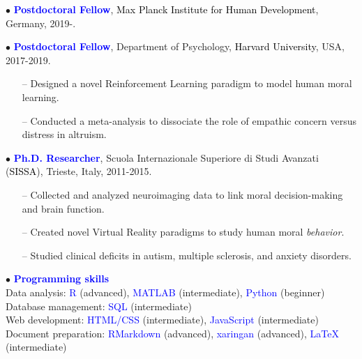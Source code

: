 \documentclass[10pt]{article}
\begin{document}
	\header


	$\bullet$ \textbf{\textcolor{blue}{Postdoctoral Fellow}}, \textcolor{black}{Max Planck Institute for Human Development}, Germany, 2019-.
	\miniskip
	
	$\bullet$ \textbf{\textcolor{blue}{Postdoctoral Fellow}}, Department of Psychology, \textcolor{black}{Harvard University}, USA, 2017-2019.
	\vspace*{-0.09in}
	
	\begin{itemize}
	\itemsep-0.1em 
	\item[--] Designed a novel Reinforcement Learning paradigm to model human moral learning.	
	\item[--] Conducted a meta-analysis to dissociate the role of empathic concern versus distress in altruism.
	\end{itemize}
	\miniskip
	\vspace*{-0.09in}

	$\bullet$ \textbf{\textcolor{blue}{Ph.D. Researcher}}, Scuola Internazionale Superiore di Studi Avanzati (\textcolor{black}{SISSA}), Trieste, Italy, 2011-2015.
	\vspace*{-0.09in}

	\begin{itemize}
	\itemsep-0.1em 
	\item[--] Collected	and analyzed neuroimaging data to link moral decision-making and brain function.
	\item[--] Created novel Virtual Reality paradigms to study human moral \textit{behavior}.
	\item[--] Studied clinical deficits in autism, multiple sclerosis, and anxiety disorders.
	\end{itemize}
    \vspace*{-0.09in}
    
	
	$\bullet$ \textcolor{blue}{\textbf{Programming skills}}\\
	\hspace*{0.1in} Data analysis: \textcolor{blue}{R} (advanced), \textcolor{blue}{MATLAB} (intermediate), \textcolor{blue}{Python} (beginner)\\
	\hspace*{0.1in} Database management: \textcolor{blue}{SQL} (intermediate)\\
	\hspace*{0.1in} Web development: \textcolor{blue}{HTML/CSS} (intermediate), \textcolor{blue}{JavaScript} (intermediate)\\
	\hspace*{0.1in}	Document preparation: \textcolor{blue}{RMarkdown} (advanced), \textcolor{blue}{xaringan} (advanced), \textcolor{blue}{\LaTeX{}} (intermediate)%
	\miniskip
	
\end{document}
